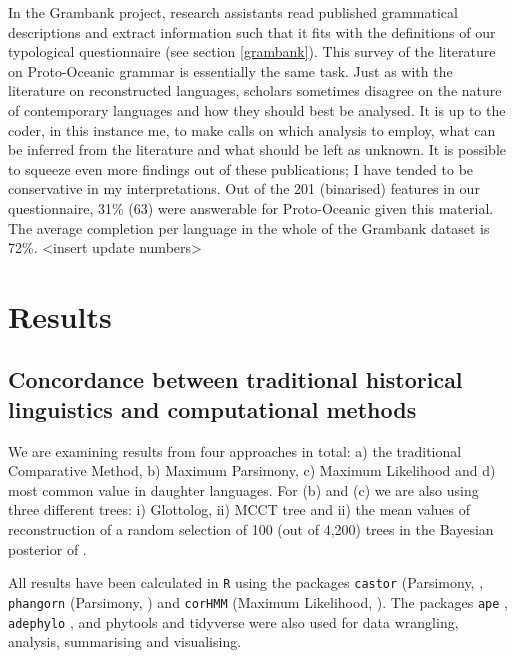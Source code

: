 \documentclass[a4paper,10pt]{article} %
\begin{document}
In the Grambank project, research assistants read published grammatical descriptions and extract information such that it fits with the definitions of our typological questionnaire (see section \ref{grambank}). This survey of the literature on Proto-Oceanic grammar is essentially the same task. Just as with the literature on reconstructed languages, scholars sometimes disagree on the nature of contemporary languages and how they should best be analysed. It is up to the coder, in this instance me, to make calls on which analysis to employ, what can be inferred from the literature and what should be left as unknown. It is possible to squeeze even more findings out of these publications; I have tended to be conservative in my interpretations. Out of the 201 (binarised) features in our questionnaire, 31\% (63) were answerable for Proto-Oceanic given this material. The average completion per language in the whole of the Grambank dataset is 72\%. <insert update numbers>

\newpage
\section{Results}

\subsection{Concordance between traditional historical linguistics and computational methods}

We are examining results from four approaches in total: a) the traditional Comparative Method, b) Maximum Parsimony, c) Maximum Likelihood and d) most common value in daughter languages. For (b) and (c) we are also using three different trees: i) Glottolog, ii) \citet{grayetal_2009} MCCT tree and ii) the mean values of reconstruction of a random selection of 100 (out of 4,200) trees in the Bayesian posterior of \citet{grayetal_2009}.


All results have been calculated in \texttt{R} \citep{R} using the packages \texttt{castor} (Parsimony, \citet{louca2017efficient}, \texttt{phangorn} (Parsimony, \citet{phangorn}) and \texttt{corHMM} (Maximum Likelihood, \citet{corHMM}). The packages \texttt{ape} \citep{paradis2004ape}, \texttt{adephylo} \citep{jombart2017package}, and phytools \citep{revell2012phytools} and tidyverse \citep{tidyverse13} were also used for data wrangling, analysis, summarising and visualising.
\end{document}
